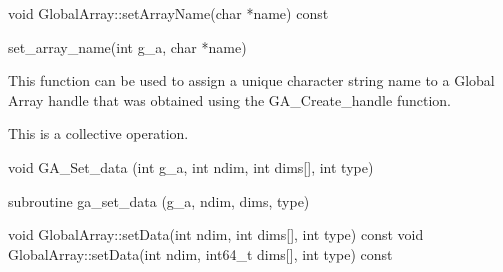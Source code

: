 \documentclass[12pt]{article}
\begin{document}
\begin{cxxapi}
\begin{cxxcode}
void GlobalArray::setArrayName(char *name) const
\end{cxxcode}
\begin{funcargs}
\end{funcargs}
\end{cxxapi}

\begin{pyapi}
\begin{pycode}
set_array_name(int g_a, char *name)
\end{pycode}
\end{pyapi}

\begin{desc}

  This function can be used to assign a unique character string name
  to a Global Array handle that was obtained using the
  GA_Create_handle function.

  This is a collective operation.

\end{desc}



\begin{capi}
\begin{ccode}
void GA_Set_data (int g_a, int ndim, int dims[], int type)
\end{ccode}
\begin{funcargs}
\end{funcargs}
\end{capi}

\begin{fapi}
\begin{fcode}
subroutine ga_set_data (g_a, ndim, dims, type)
\end{fcode}
\begin{funcargs}
\end{funcargs}
\end{fapi}

\begin{cxxapi}
\begin{cxxcode}
void GlobalArray::setData(int ndim, int dims[], int type) const
void GlobalArray::setData(int ndim, int64_t dims[], int type) const
\end{cxxcode}
\begin{funcargs}
\end{funcargs}
\end{cxxapi}
\end{document}
